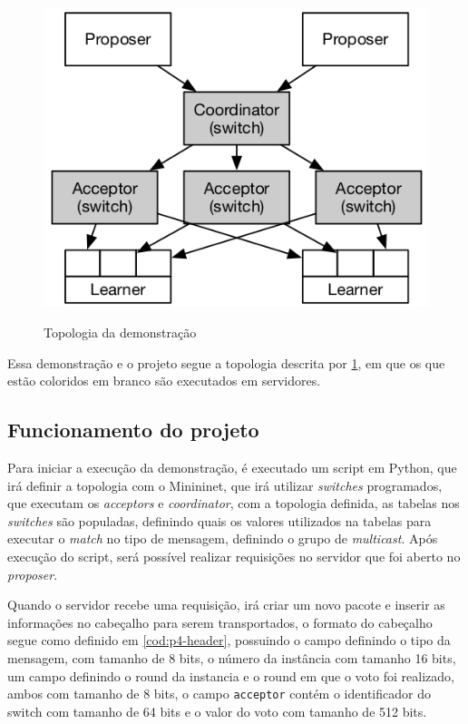 \documentclass[
    12pt,
    openright, 
    oneside,
    a4paper,
    french,
    english,
    brazil
    ]{facom-ufu-abntex2}
\theoremstyle{definition}
\begin{document}
\begin{figure}[ht]
    \caption{Topologia da demonstração \cite{dang2016paxos}}
    \centering
    \includegraphics[scale=0.8]{images/arq.png}
    \label{fig:demo-topo}
\end{figure}

Essa demonstração e o projeto segue a topologia descrita por \ref{fig:demo-topo}, em que os
que estão coloridos em branco são executados em servidores.

\subsection{Funcionamento do projeto}
Para iniciar a execução da demonstração, é executado um script em Python, que irá definir a
topologia com o Minininet, que irá utilizar \emph{switches} programados, que executam os \emph{acceptors}
e \emph{coordinator}, com a topologia definida, as tabelas nos \emph{switches} são populadas, definindo
quais os valores utilizados na tabelas para executar o \emph{match} no tipo de mensagem, definindo o
grupo de \emph{multicast}. Após execução do script, será possível realizar requisições no servidor
que foi aberto no \emph{proposer}.

Quando o servidor recebe uma requisição, irá criar um novo pacote e inserir as informações no
cabeçalho para serem transportados, o formato do cabeçalho segue como definido em \ref{cod:p4-header}, 
possuindo o campo definindo o tipo da mensagem, com tamanho de 8 bits, o número da instância com tamanho 16 bits,
um campo definindo o round da instancia e o round em que o voto foi realizado, ambos com tamanho de
8 bits, o campo \texttt{acceptor} contém o identificador do switch com tamanho de 64 bits e o valor do
voto com tamanho de 512 bits.
\end{document}
